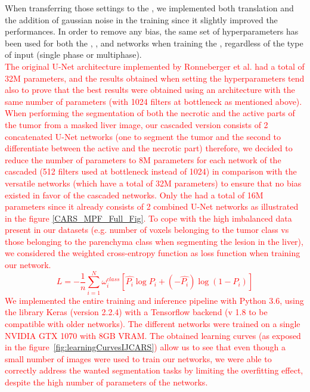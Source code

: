 When transferring those settings to the \textbf{}, 
we implemented both translation and the addition of gaussian
noise in the training since it slightly improved the performances.
In order to remove any bias, the same set of hyperparameters has been
used for both the , ,  and
 networks when training the \textbf{}, regardless of the
type of input (single phase or multiphase). \\
\textcolor{red}{
The original U-Net architecture implemented by Ronneberger et al. had a total of 32M parameters, and the results obtained when setting the hyperparameters tend also to prove that the best results were obtained using an architecture with the same number of parameters (with 1024 filters at bottleneck as mentioned above). When performing the segmentation of both the necrotic and the active parts of the tumor from a masked liver image, our cascaded version consists of 2 concatenated U-Net networks (one to segment the tumor and the second to differentiate between the active and the necrotic part) therefore, we decided to reduce the number of parameters to 8M parameters for each network of the cascaded (512 filters used at bottleneck instead of 1024) in comparison with the versatile networks (which have a total of 32M parameters) to ensure that no bias existed in favor of the cascaded networks.
Only the  had a total of 16M parameters since it already consists of 2 combined U-Net networks as illustrated in the figure \ref{CARS_MPF_Full_Fig}.
To cope with the high imbalanced data present in our datasets (e.g. number of voxels belonging to the tumor class vs those belonging to the parenchyma class when segmenting the lesion in the liver), we considered the weighted cross-entropy function as loss function when training our network. 
\begin{equation}
L = -\frac{1}{n} \sum_{i=1}^{N}\omega_i^{class}\left[\hat{P_i} \log P_i + (-\hat{P_i})\log (1 - P_i)\right]
\end{equation}
We implemented the entire training and inference pipeline with Python 3.6, using the library Keras (version 2.2.4) with a Tensorflow backend (v 1.8 to be compatible with older networks). The different networks were trained on a single NVIDIA GTX 1070 with 8GB VRAM. 
The obtained learning curves (as exposed in the figure \ref{fig:learningCurvesIJCARS}) allow us to see that even though a small number of images were used to train our networks, we were able to correctly address the wanted segmentation tasks by limiting the overfitting effect, despite the high number of parameters of the networks.
}
